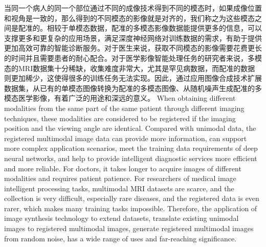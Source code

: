 \documentclass[letterpaper]{article} %
\begin{document}
当同一个病人的同一个部位通过不同的成像技术得到不同的模态时，如果成像位置和视角是一致的，那么得到的不同模态的影像就是对齐的，我们称之为这些模态之间是配准的。相较于单模态数据，配准的多模态影像数据能提供更多的信息，可以支撑更多和更复杂的应用场景，满足深度神经网络对训练数据的需求，有助于提供更加高效可靠的智能诊断服务。对于医生来说，获取不同模态的影像需要花费更长的时间并且需要患者的耐心配合。对于医学影像智能处理任务的研究者来说，多模态的MRI数据集十分稀缺，收集难度非常大，尤其是罕见病数据，而配准的数据则更加稀少，这使得很多的训练任务无法实现。因此，通过应用图像合成技术扩展数据集，从已有的单模态图像转换为配准的多模态图像、从随机噪声生成配准的多模态医学影像，有着广泛的用途和深远的意义。
When obtaining different modalities from the same part of the same patient  through different imaging techniques, these modalities are considered to be registered if the imaging position and the viewing angle are identical.  Compared with unimodal data, the registered multimodal image data can provide more information, can support more complex application scenarios, meet the training data requirements of deep neural networks, and help to provide  intelligent diagnostic services more efficient and more reliable. For doctors, it takes longer to acquire images of different modalities and requires patient patience. For researchers of medical image intelligent processing tasks, multimodal MRI datasets are scarce, and the collection is very difficult, especially rare diseases, and the registered data is even rarer, which makes many training tasks impossible. Therefore, the application of image synthesis technology to extend datasets, translate existing unimodal images to registered multimodal images, generate registered multimodal images from random noise, has a wide range of uses and far-reaching significance.
\end{document}
